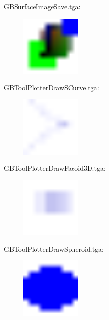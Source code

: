 GBSurfaceImageSave.tga:\\
\begin{center}
\begin{figure}[H]
\centering\includegraphics[width=3cm]{./GBSurfaceImageSave.png}\\
\end{figure}
\end{center}

GBToolPlotterDrawSCurve.tga:\\
\begin{center}
\begin{figure}[H]
\centering\includegraphics[width=3cm]{./GBToolPlotterDrawSCurve.png}\\
\end{figure}
\end{center}

GBToolPlotterDrawFacoid3D.tga:\\
\begin{center}
\begin{figure}[H]
\centering\includegraphics[width=3cm]{./GBToolPlotterDrawFacoid3D.png}\\
\end{figure}
\end{center}

GBToolPlotterDrawSpheroid.tga:\\
\begin{center}
\begin{figure}[H]
\centering\includegraphics[width=3cm]{./GBToolPlotterDrawSpheroid.png}\\
\end{figure}
\end{center}

